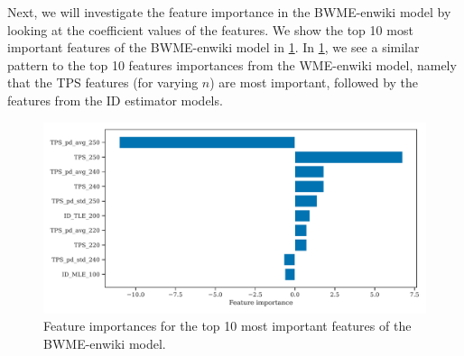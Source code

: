 Next, we will investigate the feature importance in the BWME-enwiki model by looking at the coefficient values of the features. We show the top 10 most important features of the BWME-enwiki model in \cref{fig:bwme-enwiki-feature-importances}. In \cref{fig:bwme-enwiki-feature-importances}, we see a similar pattern to the top 10 features importances from the WME-enwiki model, namely that the TPS features (for varying $n$) are most important, followed by the features from the ID estimator models.
\begin{figure}[H]
    \centering
    \includegraphics[width=\textwidth]{thesis/figures/bwme-enwiki-top-10-feature-importances.pdf}
    \caption{Feature importances for the top 10 most important features of the BWME-enwiki model.}
    \label{fig:bwme-enwiki-feature-importances}
\end{figure}

